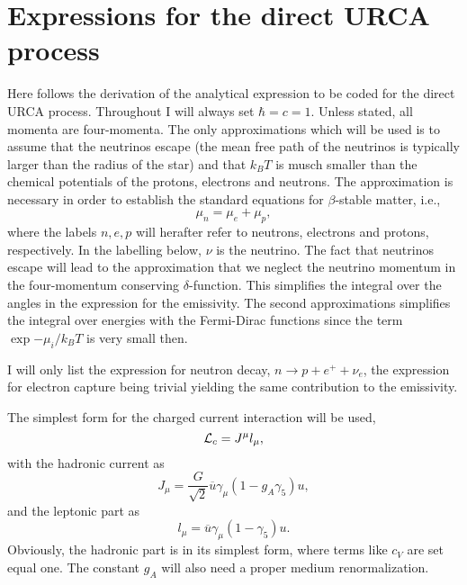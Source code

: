 


\pagestyle{plain}

\section*{Expressions for the direct URCA process}

Here follows the derivation of the analytical 
expression to be coded  for the direct URCA process.
Throughout I will always set $\hbar = c =1$.
Unless stated, all momenta are four-momenta.
The only approximations which will be used is to assume
that the neutrinos escape (the mean free path of the neutrinos
is typically larger than the radius of the star) and that 
$k_BT$ is musch smaller than the chemical potentials of the 
protons, electrons and neutrons. 
The approximation is necessary in order to establish the standard
equations for $\beta$-stable matter, i.e., 
\begin{equation}
      \mu_n=\mu_e+\mu_p,
\end{equation}
where the labels $n,e,p$ will herafter refer to neutrons, electrons and
protons, respectively. In the labelling below, $\nu$ is the
neutrino. The fact that neutrinos escape will lead to the 
approximation that we neglect the neutrino momentum in the
four-momentum conserving $\delta$-function.  
This simplifies the integral over the angles in the expression
for the emissivity. The second approximations simplifies the integral
over energies with the Fermi-Dirac functions since the term 
$\exp{-\mu_i/k_BT}$ is very small then.  

I will only list the expression for neutron decay,
$n\rightarrow p+e^++\nu_e$, the expression
for electron capture being trivial yielding the same contribution to
the emissivity.

The simplest form for the charged current interaction will be used,
\begin{equation}
      {\cal L}_c = J^{\mu}l_{\mu},
\end{equation}
with the hadronic current as
\begin{equation}
      J_{\mu}=\frac{G}{\sqrt{2}}\overline{u}\gamma_{\mu}(1-g_A\gamma_5)u,
\end{equation}
and the leptonic part as
\begin{equation}
      l_{\mu}=\overline{u}\gamma_{\mu}(1-\gamma_5)u.
\end{equation}
Obviously, the hadronic part is in its simplest form, where terms
like $c_V$ are set equal one. The constant $g_A$ will also need a proper
medium renormalization.

